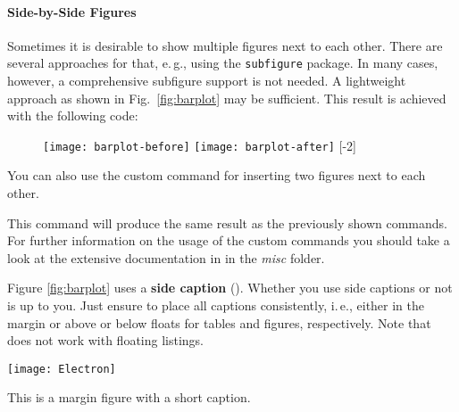 \paragraph{Side-by-Side Figures} Sometimes it is desirable to show multiple figures next to each other. There are several approaches for that, e.\,g., using the \texttt{subfigure} package. In many cases, however, a comprehensive subfigure support is not needed. A lightweight approach as shown in Fig.~\ref{fig:barplot} may be sufficient. This result is achieved with the following code:
\begin{latex}
\begin{figure}[t]
\centering
\texttt{[image: barplot-before]}%
\hspace{\fill}%
\texttt{[image: barplot-after]}
[-2\baselineskip]
\end{figure}
\end{latex}

You can also use the custom command  for inserting two figures next to each other.

\begin{latex}
\end{latex}

This command will produce the same result as the previously shown commands.
For further information on the usage of the custom commands you should take a look at the extensive documentation in  in the \emph{misc} folder.


Figure \ref{fig:barplot} uses a \textbf{side caption} (). Whether you use side captions or not is up to you.
Just ensure to place all captions consistently, i.\,e., either in the margin or above or below floats for tables and figures, respectively. Note that  does not work with floating listings.

\begin{marginfigure}[1\baselineskip] %
\texttt{[image: Electron]}
\caption{\label{fig:marfig}This is a margin figure with a short caption.}
\end{marginfigure}

